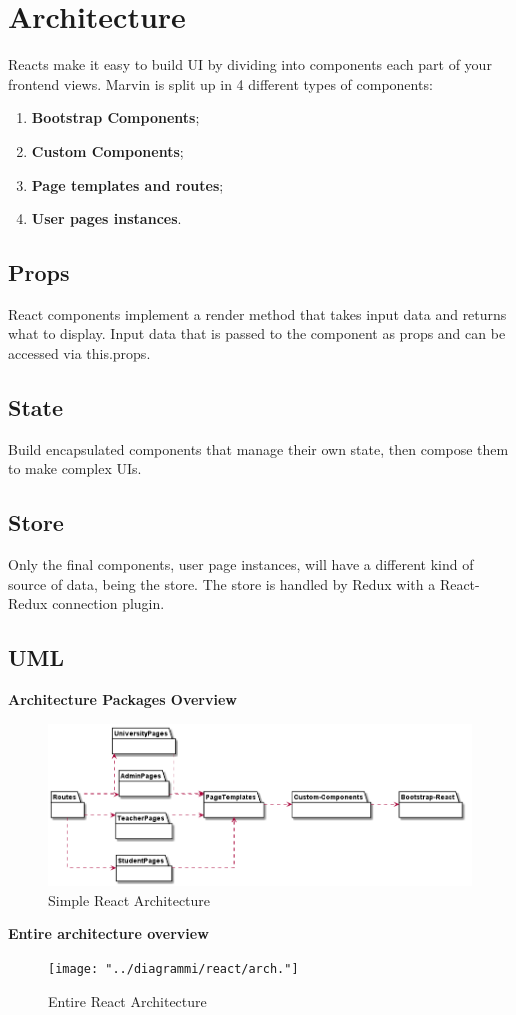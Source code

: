\documentclass[../react]{subfiles}
\begin{document}
	
	\section{Architecture}

	Reacts make it easy to build UI by dividing into components each part of your frontend views.
	Marvin is split up in 4 different types of components:
	\begin{enumerate} 
		\item \textbf{Bootstrap Components};
		\item \textbf{Custom Components};
		\item \textbf{Page templates and routes};
		\item \textbf{User pages instances}.
	\end{enumerate} 

	\subsection{Props}
	React components implement a render method that takes input data and returns what to display.
	Input data that is passed to the component as props and can be accessed via this.props.

	\subsection{State}
	Build encapsulated components that manage their own state, then compose them to make complex UIs.

	\subsection{Store}
	Only the final components, user page instances, will have a different kind of source of data, being the store.
	The store is handled by Redux with a React-Redux connection plugin.
	
	\subsection{UML} %
	
	\textbf{Architecture Packages Overview}
	\begin{figure}[H]
		\centering
		\includegraphics[width=1\linewidth]{"../diagrammi/react/simplearch"}
		\caption{Simple React Architecture}
		\label{fig:Simple React Architecture}
	\end{figure}
	
	\newpage
	\textbf{Entire architecture overview}
	\begin{figure}[H]
		\centering
		\texttt{[image: "../diagrammi/react/arch."]}
		\caption{Entire React Architecture}
		\label{fig:Entire React Architecture}
	\end{figure}
\end{document}
